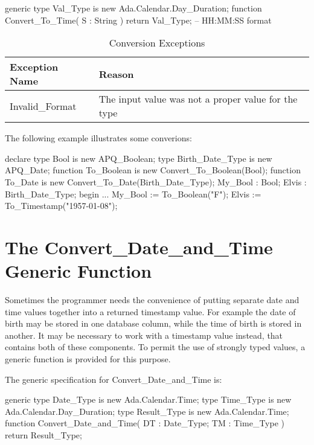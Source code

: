 \documentclass[english,letterpaper]{book}
\begin{document}
\begin{Code}
generic
   type Val_Type is new Ada.Calendar.Day_Duration;
function Convert_To_Time(
   S : String
) return Val_Type; -- HH:MM:SS format
\end{Code}

\begin{table}
   \begin{center}
      \begin{tabular}{ll}
         Exception Name    &  Reason\\
         \hline 
         Invalid\_Format   &  The input value was not a proper value for the type\\
      \end{tabular}
   \end{center}
   \caption{Conversion Exceptions}\label{t:cvtx}
\end{table}

The following example illustrates some converions:

\begin{Example}
declare
   type Bool is new APQ_Boolean;
   type Birth_Date_Type is new APQ_Date;
   function To_Boolean is new Convert_To_Boolean(Bool);
   function To_Date is new Convert_To_Date(Birth_Date_Type);
   My_Bool : Bool;
   Elvis :   Birth_Date_Type;
begin
   ...
   My_Bool := To_Boolean("F");
   Elvis   := To_Timestamp("1957-01-08");
\end{Example}

\section{The Convert\_Date\_and\_Time Generic Function}

Sometimes the programmer needs the convenience of putting separate
date and time values together into a returned timestamp
value. For example the date of birth may be stored in one database
column, while the time of birth is stored in another.
It may be necessary to work with a timestamp value instead, that contains
both of these components. To permit the use of strongly typed values,
a generic function is provided for this purpose.

The generic specification for Convert\_Date\_and\_Time is:

\begin{Code}
generic
   type Date_Type is new Ada.Calendar.Time;
   type Time_Type is new Ada.Calendar.Day_Duration;
   type Result_Type is new Ada.Calendar.Time;
function Convert_Date_and_Time(
   DT : Date_Type;
   TM : Time_Type
) return Result_Type;
\end{Code}
\end{document}

